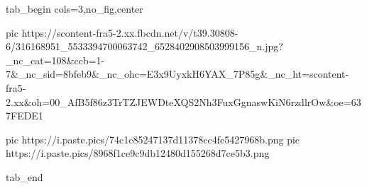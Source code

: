  
 
 
 
 


\ifcmt
  tab_begin cols=3,no_fig,center

     pic https://scontent-fra5-2.xx.fbcdn.net/v/t39.30808-6/316168951_5533394700063742_6528402908503999156_n.jpg?_nc_cat=108&ccb=1-7&_nc_sid=8bfeb9&_nc_ohc=E3x9UyxkH6YAX_7P85g&_nc_ht=scontent-fra5-2.xx&oh=00_AfB5f86z3TrTZJEWDteXQS2Nh3FuxGgnaswKiN6rzdlrOw&oe=637FEDE1

     pic https://i.paste.pics/74c1c85247137d11378cc4fe5427968b.png
     pic https://i.paste.pics/8968f1ce9c9db12480d155268d7ce5b3.png

  tab_end
\fi
